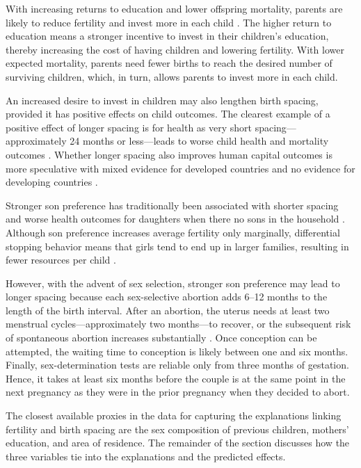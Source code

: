 \documentclass[12pt,letterpaper]{article}
\begin{document}
With increasing returns to education and lower offspring mortality, parents are likely to 
reduce fertility and invest more in each child \citep{Rosenzweig1982a,Wolpin1997}.
The higher return to education means a stronger incentive to invest in their children's
education, thereby increasing the cost of having children and lowering fertility. 
With lower expected mortality, parents need fewer births to reach the desired number of
surviving children, which, in turn, allows parents to invest more in each child.

An increased desire to invest in children may also lengthen birth spacing, provided it has 
positive effects on child outcomes. 
The clearest example of a positive effect of longer spacing is for health as very short 
spacing---approximately 24 months or less---leads to worse child health and mortality 
outcomes \citep{Whitworth2002,Conde-Agudelo2012}.
Whether longer spacing also improves human capital outcomes is more speculative with
mixed evidence for developed countries and no evidence for developing countries
\citep{Zajonc1976,Powell1993,Pettersson-Lidbom2009,Buckles2012,Barclay2017}.

Stronger son preference has traditionally been associated with shorter spacing and worse
health outcomes for daughters when there no sons in the household
\citep{Whitworth2002,Jayachandran2011}.
Although son preference increases average fertility only marginally, differential stopping
behavior means that girls tend to end up in larger families, resulting in fewer resources
per child \citep{repetto72,clark00,Basu2010,Barcellos2014}.
 
However, with the advent of sex selection, stronger son preference may lead to longer
spacing because each sex-selective abortion adds 6–12 months to the length of the birth
interval.
After an abortion, the uterus needs at least two menstrual cycles---approximately 
two months---to recover, or the subsequent risk of spontaneous abortion increases 
substantially \citep{zhou00b}.
Once conception can be attempted, the waiting time to conception is likely between
one and six months. 
Finally, sex-determination tests are reliable only from three months of gestation. 
Hence, it takes at least six months before the couple is at the same point in the next 
pregnancy as they were in the prior pregnancy when they decided to abort.

The closest available proxies in the data for capturing the explanations linking
fertility and birth spacing are the sex composition of previous children, mothers'
education, and area of residence. 
The remainder of the section discusses how the three variables tie into the
explanations and the predicted effects.
\end{document}
